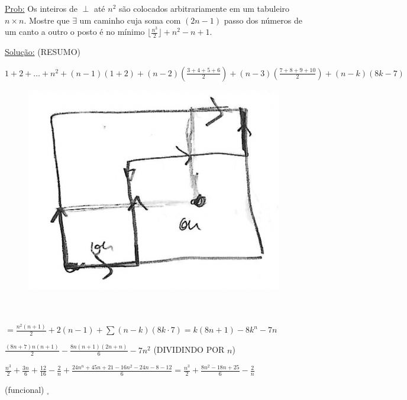 \documentclass[a4paper,12pt]{article}
\theoremstyle{plain} %
\theoremstyle{definition} %
\theoremstyle{remark} %
\begin{document}
	\vspace{2ex}\underline{Prob:} Os inteiros de $\perp$ at\'e $n^2$ s\~ao colocados arbitrariamente em um tabuleiro $n\times n$. Mostre que $\exists$ um caminho cuja soma com $(2n-1)$ passo dos n\'umeros de um canto a outro o posto \'e no m\'inimo $\lfloor\frac{n^3}{2}\rfloor +n^2-n+1$.
	
	\begin{framed}
		\underline{Solu\c{c}\~ao:} (RESUMO)
		
		$\displaystyle1+2+\ldots+n^{2}+(n-1)(1+2)+(n-2)\left(\frac{3+4+5+6}{2}\right)+(n-3)\left(\frac{7+8+9+10}{2}\right)+(n-k)(8k-7)$
		
		\vspace{-2em}
		\begin{figure}
			\includegraphics[width=0.9\linewidth]{2 page 22.png}
		\end{figure} \, \\
		
		\, \\
		$=\displaystyle\frac{n^{2}(n+1)}{2}+2(n-1)+\sum(n-k)(8 k \cdot 7) =k(8 n+1)-8 k^{n}-7 n$ 
		
		\vspace{1em}
		\begin{center}
			$\displaystyle\frac{(8 n+7) n(n+1)}{2}-\frac{8 n(n+1)(2 n+n)}{6}-7 n^{2}$ (DIVIDINDO POR $n$)
		\end{center} 
		
		$\displaystyle\frac{n^{3}}{2}+\frac{3 n}{6}+\frac{12}{16}-\frac{2}{n}+\frac{24 n^{n}+45 n+21-16 n^{2}-24 n-8-12}{6}=\frac{n^{3}}{2}+\frac{8 n^{2}-18 n+25}{6}-\frac{2}{n}$
		
		\vspace{1ex}
		\hfill(funcional) $_\square$
		
	\end{framed}
	
\end{document}
